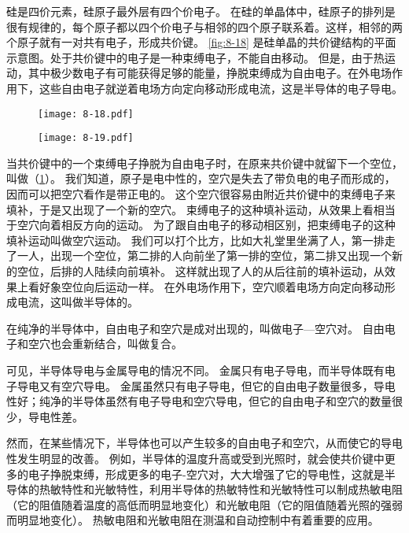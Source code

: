 硅是四价元素，硅原子最外层有四个价电子。
在硅的单晶体中，硅原子的排列是很有规律的，每个原子都以四个价电子与相邻的四个原子联系着。这样，相邻的两个原子就有一对共有电子，形成共价键。
\cref{fig:8-18} 是硅单晶的共价键结构的平面示意图。处于共价键中的电子是一种束缚电子，不能自由移动。
但是，由于热运动，其中极少数电子有可能获得足够的能量，挣脱束缚成为自由电子。在外电场作用下，这些自由电子就逆着电场方向定向移动形成电流，这是半导体的电子导电。
\begin{figure}
  \begin{minipage}[b]{0.48\linewidth}\centering
    \texttt{[image: 8-18.pdf]}
    \caption{}\label{fig:8-18}
  \end{minipage}
  \begin{minipage}[b]{0.48\linewidth}\centering
    \texttt{[image: 8-19.pdf]}
    \caption{}\label{fig:8-19}
  \end{minipage}
\end{figure}

当共价键中的一个束缚电子挣脱为自由电子时，在原来共价键中就留下一个空位，叫做（\cref{fig:8-19}）。
我们知道，原子是电中性的，空穴是失去了带负电的电子而形成的，因而可以把空穴看作是带正电的。
这个空穴很容易由附近共价键中的束缚电子来填补，于是又出现了一个新的空穴。
束缚电子的这种填补运动，从效果上看相当于空穴向着相反方向的运动。
为了跟自由电子的移动相区别，把束缚电子的这种填补运动叫做空穴运动。
我们可以打个比方，比如大礼堂里坐满了人，第一排走了一人，出现一个空位，第二排的人向前坐了第一排的空位，第二排又出现一个新的空位，后排的人陆续向前填补。
这样就出现了人的从后往前的填补运动，从效果上看好象空位向后运动一样。
在外电场作用下，空穴顺着电场方向定向移动形成电流，这叫做半导体的。

在纯净的半导体中，自由电子和空穴是成对出现的，叫做电子—空穴对。
自由电子和空穴也会重新结合，叫做复合。

可见，半导体导电与金属导电的情况不同。
金属只有电子导电，而半导体既有电子导电又有空穴导电。
金属虽然只有电子导电，但它的自由电子数量很多，导电性好；纯净的半导体虽然有电子导电和空穴导电，但它的自由电子和空穴的数量很少，导电性差。

然而，在某些情况下，半导体也可以产生较多的自由电子和空穴，从而使它的导电性发生明显的改善。
例如，半导体的温度升高或受到光照时，就会使共价键中更多的电子挣脱束缚，形成更多的电子-空穴对，大大增强了它的导电性，这就是半导体的热敏特性和光敏特性，利用半导体的热敏特性和光敏特性可以制成热敏电阻（它的阻值随着温度的高低而明显地变化）和光敏电阻（它的阻值随着光照的强弱而明显地变化）。
热敏电阻和光敏电阻在测温和自动控制中有着重要的应用。

